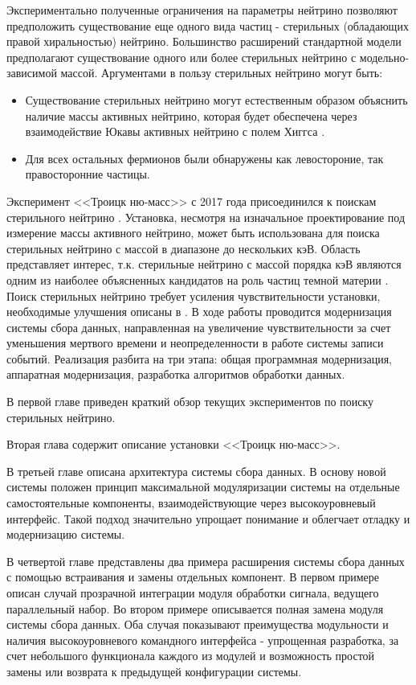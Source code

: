\documentclass[a4paper,14pt]{extreport}
\begin{document}
Экспериментально полученные ограничения на параметры нейтрино позволяют предположить существование еще одного  вида частиц - стерильных (обладающих правой хиральностью) нейтрино. Большинство расширений стандартной модели предполагают существование одного или более стерильных нейтрино с модельно-зависимой массой. Аргументами в пользу стерильных нейтрино могут быть:
\begin{itemize}
    \item Существование стерильных нейтрино могут естественным образом объяснить наличие массы активных нейтрино, которая будет обеспечена через взаимодействие Юкавы активных нейтрино с полем Хиггса \cite{dm-kev-sterile-neutrino-whitepaper}.
    \item Для всех остальных фермионов были обнаружены как  левостороние, так правосторонние частицы.
\end{itemize}{}

Эксперимент <<Троицк ню-масс>> с 2017 года присоединился к поискам стерильного нейтрино \cite{1703.10779}. Установка, несмотря на изначальное проектирование под измерение массы активного нейтрино, может быть использована для поиска стерильных нейтрино с массой в диапазоне до нескольких кэВ. Область представляет интерес, т.к. стерильные нейтрино с массой порядка кэВ являются одним из наиболее объясненных кандидатов на роль частиц темной материи \cite{dm-kev-sterile-neutrino-whitepaper}. Поиск стерильных нейтрино требует усиления чувствительности установки, необходимые улучшения описаны в \cite{2015JInst..1010005A}. В ходе работы проводится модернизация системы сбора данных, направленная на увеличение чувствительности за счет уменьшения мертвого времени и неопределенности в работе системы записи событий. Реализация разбита на три этапа: общая программная модернизация, аппаратная модернизация, разработка алгоритмов обработки данных.

В первой главе приведен краткий обзор текущих экспериментов по поиску стерильных нейтрино. 

Вторая глава содержит описание установки <<Троицк ню-масс>>.

В третьей главе описана архитектура системы сбора данных. В основу новой системы положен принцип максимальной модуляризации системы на отдельные самостоятельные компоненты, взаимодействующие через высокоуровневый интерфейс. Такой подход значительно упрощает понимание и облегчает отладку и модернизацию системы.

В четвертой главе представлены два примера расширения системы сбора данных с помощью встраивания и замены отдельных компонент. В первом примере описан случай прозрачной интеграции модуля обработки сигнала, ведущего параллельный набор. Во втором примере описывается полная замена модуля системы сбора данных. Оба случая показывают преимущества модульности и наличия высокоуровневого командного интерфейса - упрощенная разработка, за счет небольшого функционала каждого из модулей и возможность простой замены или возврата к предыдущей конфигурации системы.
\end{document}
